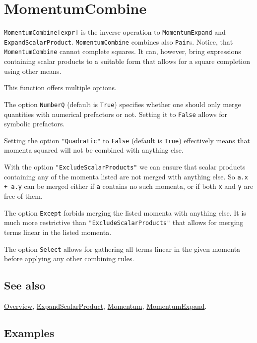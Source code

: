 \documentclass[../FeynCalcManual.tex]{subfiles}
\begin{document}
\hypertarget{momentumcombine}{
\section{MomentumCombine}\label{momentumcombine}}

\texttt{MomentumCombine[\allowbreak{}expr]} is the inverse operation to
\texttt{MomentumExpand} and \texttt{ExpandScalarProduct}.
\texttt{MomentumCombine} combines also \texttt{Pair}s. Notice, that
\texttt{MomentumCombine} cannot complete squares. It can, however, bring
expressions containing scalar products to a suitable form that allows
for a square completion using other means.

This function offers multiple options.

The option \texttt{NumberQ} (default is \texttt{True}) specifies whether
one should only merge quantities with numerical prefactors or not.
Setting it to \texttt{False} allows for symbolic prefactors.

Setting the option \texttt{"Quadratic"} to \texttt{False} (default is
\texttt{True}) effectively means that momenta squared will not be
combined with anything else.

With the option \texttt{"ExcludeScalarProducts"} we can ensure that
scalar products containing any of the momenta listed are not merged with
anything else. So \texttt{a.x + a.y} can be merged either if \texttt{a}
contains no such momenta, or if both \texttt{x} and \texttt{y} are free
of them.

The option \texttt{Except} forbids merging the listed momenta with
anything else. It is much more restrictive than
\texttt{"ExcludeScalarProducts"} that allows for merging terms linear in
the listed momenta.

The option \texttt{Select} allows for gathering all terms linear in the
given momenta before applying any other combining rules.

\subsection{See also}

\hyperlink{toc}{Overview},
\hyperlink{expandscalarproduct}{ExpandScalarProduct},
\hyperlink{momentum}{Momentum},
\hyperlink{momentumexpand}{MomentumExpand}.

\subsection{Examples}
\end{document}
